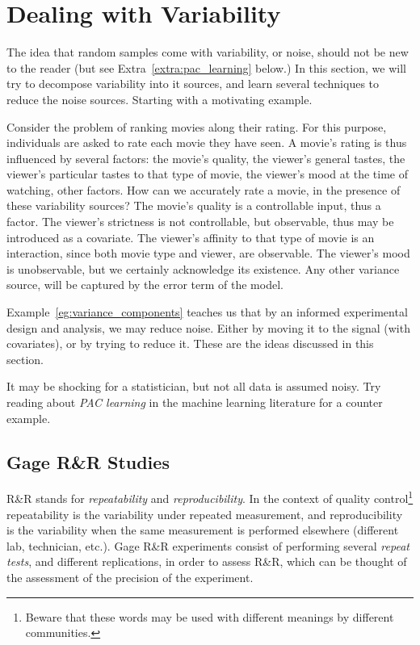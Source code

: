 \section{Dealing with Variability}
\label{sec:variance_components}

The idea that random samples come with variability, or noise, should not be new to the reader (but see Extra~\ref{extra:pac_learning} below.)
In this section, we will try to decompose variability into it sources, and learn several techniques to reduce the noise sources. 
Starting with a motivating example.



\begin{example}
\label{eg:variance_components}
Consider the problem of ranking movies along their rating.
For this purpose, individuals are asked to rate each movie they have seen.
A movie's rating is thus influenced by several factors:
the movie's quality, 
the viewer's general tastes, 
the viewer's particular tastes to that type of movie,
the viewer's mood at the time of watching,
other factors.
How can we accurately rate a movie, in the presence of these variability sources?
The movie's quality is a controllable input, thus a factor.
The viewer's strictness is not controllable, but observable, thus may be introduced as a covariate.
The viewer's affinity to that type of movie is an interaction, since both movie type and viewer, are observable.
The viewer's mood is unobservable, but we certainly acknowledge its existence. 
Any other variance source, will be captured by the error term of the model. 
\end{example}

Example~\ref{eg:variance_components} teaches us that by an informed experimental design and analysis, we may reduce noise.
Either by moving it to the signal (with covariates), or by trying to reduce it.
These are the ideas discussed in this section.


\begin{extra}
\label{extra:pac_learning}
It may be shocking for a statistician, but not all data is assumed noisy.
Try reading about \emph{PAC learning} in the machine learning literature for a counter example.
\end{extra}




\subsection{Gage R\&R Studies}
R\&R stands for \emph{repeatability} and \emph{reproducibility}.
In the context of quality control\footnote{Beware that these words may be used with different meanings by different communities.} repeatability is the variability under repeated measurement, and reproducibility is the variability when the same measurement is performed elsewhere (different lab, technician, etc.).
Gage R\&R experiments consist of performing several \emph{repeat tests}, and different replications, in order to assess R\&R, which can be thought of the assessment of the precision of the experiment. 




